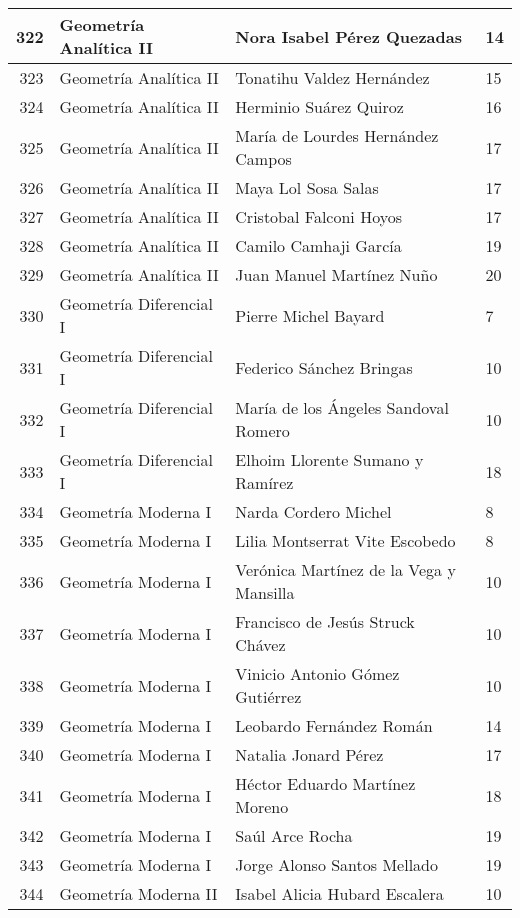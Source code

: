 \begin{table}[ht]
\begin{tabular}{rlll}
  322 & Geometría Analítica II & Nora Isabel Pérez Quezadas & 14 \\ \hline
  323 & Geometría Analítica II & Tonatihu Valdez Hernández & 15 \\ \hline
  324 & Geometría Analítica II & Herminio Suárez Quiroz & 16 \\ \hline
  325 & Geometría Analítica II & María de Lourdes Hernández Campos & 17 \\ \hline
  326 & Geometría Analítica II & Maya Lol Sosa Salas & 17 \\ \hline
  327 & Geometría Analítica II & Cristobal Falconi Hoyos & 17 \\ \hline
  328 & Geometría Analítica II & Camilo Camhaji García & 19 \\ \hline
  329 & Geometría Analítica II & Juan Manuel Martínez Nuño & 20 \\ \hline
  330 & Geometría Diferencial I & Pierre Michel Bayard & 7 \\ \hline
  331 & Geometría Diferencial I & Federico Sánchez Bringas & 10 \\ \hline
  332 & Geometría Diferencial I & María de los Ángeles Sandoval Romero & 10 \\ \hline
  333 & Geometría Diferencial I & Elhoim Llorente Sumano y Ramírez & 18 \\ \hline
  334 & Geometría Moderna I & Narda Cordero Michel & 8 \\ \hline
  335 & Geometría Moderna I & Lilia Montserrat Vite Escobedo & 8 \\ \hline
  336 & Geometría Moderna I & Verónica Martínez de la Vega y Mansilla & 10 \\ \hline
  337 & Geometría Moderna I & Francisco de Jesús Struck Chávez & 10 \\ \hline
  338 & Geometría Moderna I & Vinicio Antonio Gómez Gutiérrez & 10 \\ \hline
  339 & Geometría Moderna I & Leobardo Fernández Román & 14 \\ \hline
  340 & Geometría Moderna I & Natalia Jonard Pérez & 17 \\ \hline
  341 & Geometría Moderna I & Héctor Eduardo Martínez Moreno & 18 \\ \hline
  342 & Geometría Moderna I & Saúl Arce Rocha & 19 \\ \hline
  343 & Geometría Moderna I & Jorge Alonso Santos Mellado & 19 \\ \hline
  344 & Geometría Moderna II & Isabel Alicia Hubard Escalera & 10 \\ \hline

\end{tabular}
\end{table}
